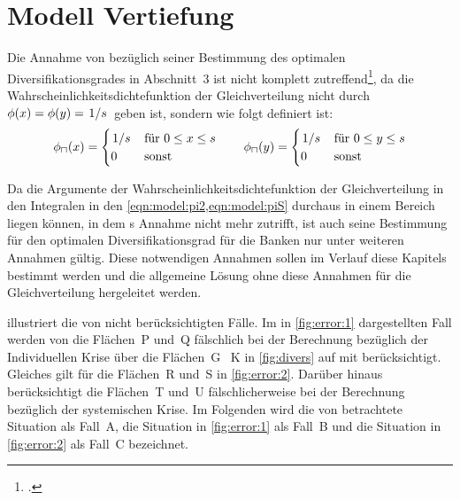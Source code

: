 
\chapter{Modell Vertiefung}%
\label{chap:advanced}

Die Annahme von \citeauthor{Wagner-2010} bezüglich seiner Bestimmung des optimalen Diversifikationsgrades in Abschnitt~3 ist nicht komplett zutreffend\footcite[\vgl{}][\pno~379(7)]{Wagner-2010}, da die Wahrscheinlichkeitsdichtefunktion der Gleichverteilung nicht durch $\phi(x)=\phi(y)=\flatfrac{1}{s}$ geben ist, sondern wie folgt definiert ist:
%
\begin{equation}
	\phi_\sqcap(x) = \begin{cases}
	                     \flatfrac{1}{s} & \text{für } 0 \leq x \leq s \\
	                     0               & \text{sonst}
	                 \end{cases} \quad\quad %
	\phi_\sqcap(y) = \begin{cases}
	                     \flatfrac{1}{s} & \text{für } 0 \leq y \leq s \\
	                     0               & \text{sonst}
	                 \end{cases} \label{eqn:def:equal_distribution}
\end{equation}

Da die Argumente der Wahrscheinlichkeitsdichtefunktion der Gleichverteilung in den Integralen in den \cref{eqn:model:pi2,eqn:model:piS} durchaus in einem Bereich liegen können, in dem \citeauthor{Wagner-2010}s Annahme nicht mehr zutrifft, ist auch seine Bestimmung für den optimalen Diversifikationsgrad für die Banken nur unter weiteren Annahmen gültig. Diese notwendigen Annahmen sollen im Verlauf diese Kapitels bestimmt werden und die allgemeine Lösung ohne diese Annahmen für die Gleichverteilung hergeleitet werden.

 illustriert die von \citeauthor{Wagner-2010} nicht berücksichtigten Fälle. Im in \cref{fig:error:1} dargestellten Fall werden von \citeauthor{Wagner-2010} die Flächen~P und~Q fälschlich bei der Berechnung bezüglich der Individuellen Krise über die Flächen~G \bzw{}~K in \cref{fig:divers} auf \pageref{fig:divers} mit berücksichtigt. Gleiches gilt für die Flächen~R und~S in \cref{fig:error:2}. Darüber hinaus berücksichtigt \citeauthor{Wagner-2010} die Flächen~T und~U fälschlicherweise bei der Berechnung bezüglich der systemischen Krise. Im Folgenden wird die von \citeauthor{Wagner-2010} betrachtete Situation als Fall~A, die Situation in \cref{fig:error:1} als Fall~B und die Situation in \cref{fig:error:2} als Fall~C bezeichnet.

